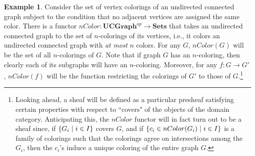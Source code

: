 \documentclass[11pt]{book}
\theoremstyle{definition}
\newtheorem{example}{Example}[section]
\theoremstyle{definition}
\theoremstyle{definition}
\theoremstyle{theorem}
\theoremstyle{definition}
\begin{document}
\begin{example} 
	\label{example: ncoloring}
	Consider the set of vertex colorings of an undirected connected graph subject to the condition that no adjacent vertices are assigned the same color. There is a functor $nColor: \textbf{UCGraph}^{op} \rightarrow \textbf{Sets}$ that takes an undirected connected graph to the set of $n$-colorings of its vertices, i.e., it colors an undirected connected graph with \textit{at most} $n$ colors. For any $G$, $nColor(G)$ will be the set of all $n$-colorings of $G$. Note that if graph $G$ has an $n$-coloring, then clearly each of its subgraphs will have an $n$-coloring. Moreover, for any $f: G \rightarrow G'$, $nColor(f)$ will be the function restricting the colorings of $G'$ to those of $G$.\footnote{Looking ahead, a sheaf will be defined as a particular presheaf satisfying certain properties with respect to ``covers" of the objects of the domain category. Anticipating this, the $nColor$ functor will in fact turn out to be a sheaf since, if $\{G_i \hspace*{0.3em}| \hspace*{0.3em} i \in I\}$ covers $G$, and if $\{c_i \in nColor(G_i) \hspace*{0.3em}| \hspace*{0.3em} i \in I \}$ is a family of colorings such that the colorings agree on intersections among the $G_i$, then the $c_i$'s induce a unique coloring of the entire graph $G$.}
\end{example}  
\end{document}
